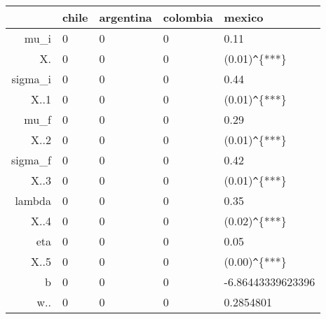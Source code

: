\begin{table}[ht]
\centering
\begin{tabular}{rllll}
  \hline
 & chile & argentina & colombia & mexico \\ 
  \hline
mu\_i & 0 & 0 & 0 & 0.11 \\ 
  X. & 0 & 0 & 0 & (0.01)\verb|^|\{***\} \\ 
  sigma\_i & 0 & 0 & 0 & 0.44 \\ 
  X..1 & 0 & 0 & 0 & (0.01)\verb|^|\{***\} \\ 
  mu\_f & 0 & 0 & 0 & 0.29 \\ 
  X..2 & 0 & 0 & 0 & (0.01)\verb|^|\{***\} \\ 
  sigma\_f & 0 & 0 & 0 & 0.42 \\ 
  X..3 & 0 & 0 & 0 & (0.01)\verb|^|\{***\} \\ 
  lambda & 0 & 0 & 0 & 0.35 \\ 
  X..4 & 0 & 0 & 0 & (0.02)\verb|^|\{***\} \\ 
  eta & 0 & 0 & 0 & 0.05 \\ 
  X..5 & 0 & 0 & 0 & (0.00)\verb|^|\{***\} \\ 
  b & 0 & 0 & 0 & -6.86443339623396 \\ 
  w.. & 0 & 0 & 0 & 0.2854801 \\ 
   \hline
\end{tabular}
\end{table}
